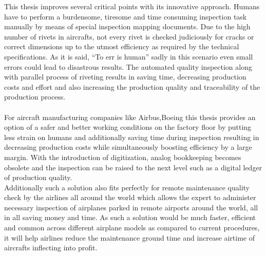 \documentclass{article}
\begin{document}
This thesis improves several critical points with its innovative approach. Humans have to perform a burdensome, tiresome and time consuming inspection task manually by means of special inspection mapping documents. Due to the high number of rivets in aircrafts, not every rivet is checked judiciously for cracks or correct dimensions up to the utmost efficiency as required by the technical specifications.
As it is said, “To err is human” sadly in this scenario even small errors could lead to disastrous results.
The automated quality inspection along with parallel process of riveting results in saving time, decreasing production costs and effort and also increasing the production quality and traceability of the production process.\\\\
For aircraft manufacturing companies like Airbus,Boeing this thesis provides an option of a safer and better working conditions on the factory floor by putting less strain on humans and additionally saving time during inspection resulting in decreasing production costs while simultaneously boosting efficiency by a large margin.
With the introduction of digitization, analog bookkeeping becomes obsolete and the inspection can be raised to the next level such as a digital ledger of production
quality.\\


Additionally such a solution also fits perfectly for remote maintenance quality
check by the airlines all around the world which allows the expert to administer necessary inspection of airplanes parked in remote airports around the world, all in all saving money and time.
As such a solution would be much faster, efficient and common across different airplane models as compared to current procedures, it will help airlines reduce the maintenance ground time and increase airtime of aircrafts inflecting into profit.
\end{document}
